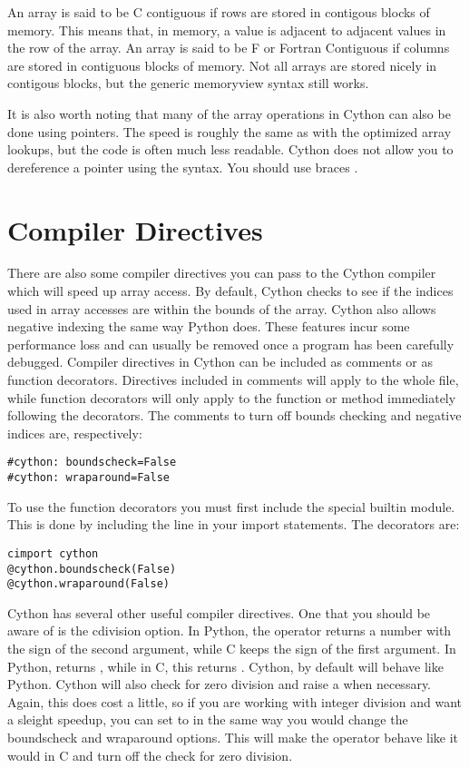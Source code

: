 An array is said to be C contiguous if rows are stored in contigous blocks of memory.
This means that, in memory, a value is adjacent to adjacent values in the row of the array.
An array is said to be F or Fortran Contiguous if columns are stored in contiguous blocks of memory.
Not all arrays are stored nicely in contigous blocks, but the generic memoryview syntax still works.

It is also worth noting that many of the array operations in Cython can also be done using pointers.
The speed is roughly the same as with the optimized array lookups, but the code is often much less readable.
Cython does not allow you to dereference a pointer using the \li{*} syntax.
You should use braces \li{[ ]}.

\section*{Compiler Directives}

There are also some compiler directives you can pass to the Cython compiler which will speed up array access.
By default, Cython checks to see if the indices used in array accesses are within the bounds of the array.
Cython also allows negative indexing the same way Python does.
These features incur some performance loss and can usually be removed once a program has been carefully debugged.
Compiler directives in Cython can be included as comments or as function decorators.
Directives included in comments will apply to the whole file, while function decorators will only apply to the function or method immediately following the decorators.
The comments to turn off bounds checking and negative indices are, respectively:
\begin{lstlisting}
#cython: boundscheck=False
#cython: wraparound=False
\end{lstlisting}

To use the function decorators you must first include the special builtin  module.
This is done by including the line  in your import statements.
The decorators are:
\begin{lstlisting}
cimport cython
@cython.boundscheck(False)
@cython.wraparound(False)
\end{lstlisting}

Cython has several other useful compiler directives.
One that you should be aware of is the cdivision option.
In Python, the \li{\%} operator returns a number with the sign of the second argument, while C keeps the sign of the first argument.
In Python,  returns , while in C, this returns .
Cython, by default will behave like Python.
Cython will also check for zero division and raise a  when necessary.
Again, this does cost a little, so if you are working with integer division and want a sleight speedup, you can set  to  in the same way you would change the boundscheck and wraparound options.
This will make the \li{\%} operator behave like it would in C and turn off the check for zero division.

